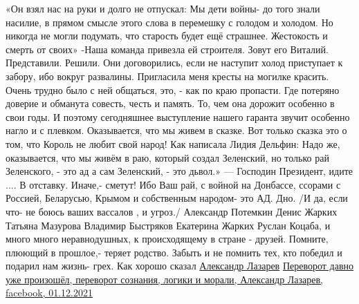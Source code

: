 \begin{multicols}{2}
«Он взял нас на руки и долго не отпускал:
Мы дети войны- до того знали насилие, 
в прямом смысле этого слова в перемешку с голодом и холодом. 
Но никогда не могли подумать, что старость будет ещё страшнее. Жестокость и смерть от своих» 
-Наша команда привезла  ей  строителя. Зовут его Виталий. Представили.  Решили.
Они договорились, если не наступит холод приступает к забору, 
ибо вокруг развалины.  Пригласила меня кресты на могилке красить.
Очень трудно было с ней общаться, это, - как по краю пропасти. 
Где потеряно доверие и обманута совесть, честь и память. 
То, чем она дорожит особенно в свои годы.
И поэтому сегодняшнее выступление нашего гаранта звучит особенно нагло и с плевком.  Оказывается, что мы живем в сказке. 
Вот только сказка это о том, что Король не любит свой народ!
Как написала Лидия Дельфин:
Надо же, оказывается, что мы живём в раю, который создал Зеленский, но только рай Зеленского, - это ад а сам Зеленский, - это дьвол.»
 —
Господин Президент, идите .... В отставку. Иначе,- сметут!
Ибо Ваш рай, с войной на Донбассе, ссорами с Россией, Беларусью, Крымом и собственным народом- это АД. Дно.
/И да, если что- не боюсь ваших вассалов , и угроз./
Александр Потемкин
Денис Жарких
Татьяна Мазурова
Владимир Быстряков
Екатерина Жарких
Руслан Коцаба, и много много  неравнодушных, к происходящему в стране - друзей. Помните, плюющий в прошлое,- теряет родство. 
Забыть и не помнить тех, кто победил и подарил нам жизнь- грех.
Как хорошо сказал \href{https://www.facebook.com/profile.php?id=100008532614385}{Александр Лазарев}
\href{https://www.facebook.com/100008532614385/posts/2735352603425800/}{%
Переворот давно уже произошёл, переворот сознания, логики и морали, Александр Лазарев, facebook, %
01.12.2021%
}
\end{multicols}
